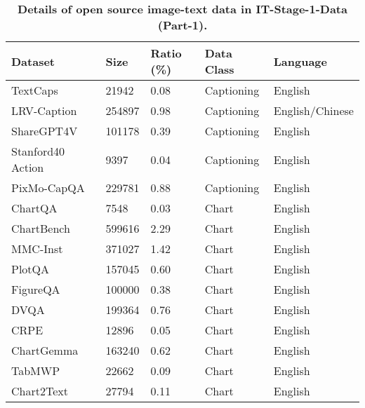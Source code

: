 \begin{table}[h]
\centering
\caption{\textbf{Details of open source image-text data in IT-Stage-1-Data (Part-1).}
}
\label{tab:appendix_sft_s1_it_1}
\setlength{\tabcolsep}{7pt}
\begin{tabular}{l|l|l|l|l}
\toprule
Dataset                         & Size    & Ratio (\%) & Data Class    & Language        \\
\midrule
TextCaps~\cite{sidorov2020textcaps}                        & 21942   & 0.08     & Captioning   & English         \\
LRV-Caption~\cite{liu2023aligning}                     & 254897  & 0.98     & Captioning   & English/Chinese \\
ShareGPT4V~\cite{chen2023sharegpt4v}            & 101178  & 0.39     & Captioning   & English         \\
Stanford40 Action~\cite{yao2011human}               & 9397    & 0.04     & Captioning   & English         \\
PixMo-CapQA~\cite{deitke2024molmo}                     & 229781  & 0.88     & Captioning   & English         \\
ChartQA~\cite{masry-etal-2022-chartqa}                         & 7548    & 0.03     & Chart        & English         \\
ChartBench~\cite{ChartBench}                      & 599616  & 2.29     & Chart        & English         \\
MMC-Inst~\cite{liu2023mmc}                        & 371027  & 1.42     & Chart        & English         \\
PlotQA~\cite{Methani_2020_WACV}                          & 157045  & 0.60      & Chart        & English         \\
FigureQA~\cite{kahou2017figureqa}                        & 100000  & 0.38     & Chart        & English         \\
DVQA~\cite{kafle2018dvqa}                            & 199364  & 0.76     & Chart        & English         \\
CRPE~\cite{wang2023allseeing}                            & 12896    & 0.05     & Chart        & English         \\
ChartGemma~\cite{masry2024chartgemma}                      & 163240  & 0.62     & Chart        & English         \\
TabMWP~\cite{lu2023dynamic}                          & 22662   & 0.09     & Chart        & English         \\
Chart2Text~\cite{kantharaj2022chart}                      & 27794   & 0.11     & Chart        & English         \\

\end{tabular}
\end{table}
